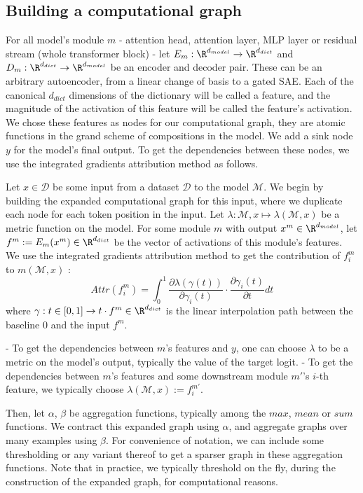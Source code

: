 \documentclass{article}
\begin{document}
\subsection{Building a computational graph}

For all model's module $m$ - attention head, attention layer, MLP layer or residual stream (whole transformer block) - let $E_m : \R^{d_{model}} \rightarrow \R^{d_{dict}}$ and $D_m : \R^{d_{dict}} \rightarrow \R^{d_{model}}$ be an encoder and decoder pair. These can be an arbitrary autoencoder, from a linear change of basis to a gated SAE. Each of the canonical $d_{dict}$ dimensions of the dictionary will be called a feature, and the magnitude of the activation of this feature will be called the feature's activation. We chose these features as nodes for our computational graph, they are atomic functions in the grand scheme of compositions in the model. %
We add a sink node $y$ for the model's final output. To get the dependencies between these nodes, we use the integrated gradients attribution method as follows.

Let $x \in \mathcal{D}$ be some input from a dataset $\mathcal{D}$ to the model $\mathcal{M}$. We begin by building the expanded computational graph for this input, where we duplicate each node for each token position in the input. Let $\lambda : \mathcal{M}, x \mapsto \lambda(\mathcal{M}, x)$ be a metric function on the model. For some module $m$ with output $x^m \in \R^{d_{model}}$, let $f^m := E_m(x^m) \in \R^{d_{dict}}$ be the vector of activations of this module's features. We use the integrated gradients attribution method to get the contribution of $f^m_i$ to $m(\mathcal{M}, x)$ :
$$ Attr(f^m_i) = \int_{0}^{1} \frac{\partial \lambda(\gamma(t))}{\partial \gamma_i(t)} \cdot \frac{\partial \gamma_i(t)}{\partial t} dt $$
where $\gamma : t \in [0, 1] \rightarrow t \cdot f^m \in \R^{d_{dict}}$ is the linear interpolation path between the baseline $0$ and the input $f^m$.

- To get the dependencies between $m$'s features and $y$, one can choose $\lambda$ to be a metric on the model's output, typically the value of the target logit.
- To get the dependencies between $m$'s features and some downstream module $m'$'s $i$-th feature, we typically choose $\lambda(\mathcal{M}, x) := f^{m'}_i$.

Then, let $\alpha$, $\beta$ be aggregation functions, typically among the $max$, $mean$ or $sum$ functions. We contract this expanded graph using $\alpha$, and aggregate graphs over many examples using $\beta$. For convenience of notation, we can include some thresholding or any variant thereof to get a sparser graph in these aggregation functions. Note that in practice, we typically threshold on the fly, during the construction of the expanded graph, for computational reasons.
\end{document}
